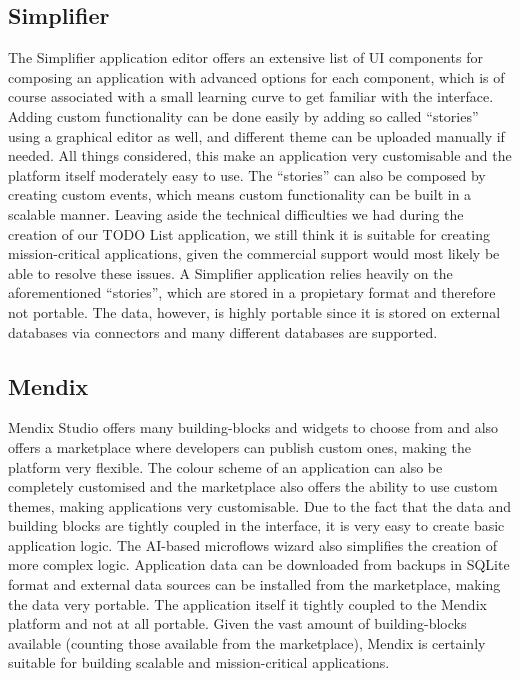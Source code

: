 \documentclass[runningheads]{llncs}
\begin{document}
\subsection{Simplifier}

The Simplifier application editor offers an extensive list of UI components for composing an application with advanced options for each component, which is of course associated with a small learning curve to get familiar with the interface. Adding custom functionality can be done easily by adding so called “stories” using a graphical editor as well, and different theme can be uploaded manually if needed. All things considered, this make an application very customisable and the platform itself moderately easy to use. The “stories” can also be composed by creating custom events, which means custom functionality can be built in a scalable manner. Leaving aside the technical difficulties we had during the creation of our TODO List application, we still think it is suitable for creating mission-critical applications, given the commercial support would most likely be able to resolve these issues. A Simplifier application relies heavily on the aforementioned “stories”, which are stored in a propietary format and therefore not portable. The data, however, is highly portable since it is stored on external databases via connectors and many different databases are supported.

\subsection{Mendix}

Mendix Studio offers many building-blocks and widgets to choose from and also offers a marketplace where developers can publish custom ones, making the platform very flexible. The colour scheme of an application can also be completely customised and the marketplace also offers the ability to use custom themes, making applications very customisable. Due to the fact that the data and building blocks are tightly coupled in the interface, it is very easy to create basic application logic. The AI-based microflows wizard also simplifies the creation of more complex logic. Application data can be downloaded from backups in SQLite format and external data sources can be installed from the marketplace, making the data very portable. The application itself it tightly coupled to the Mendix platform and not at all portable. Given the vast amount of building-blocks available (counting those available from the marketplace), Mendix is certainly suitable for building scalable and mission-critical applications.
\end{document}
